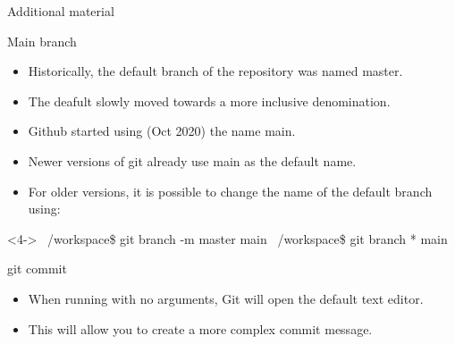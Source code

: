 \begin{frame}{Additional material}
  
\end{frame}

\begin{frame}[fragile]{Main branch}
  \begin{itemize}[<+->]
      \item Historically, the default branch of the repository was named \alert{master}.
      \item The deafult slowly moved towards a more inclusive denomination.
      \item Github started using (Oct 2020) the name \alert{main}.
      \item Newer versions of git already use \alert{main} as the default name.
      \item For older versions, it is possible to change the name of the default branch using:
  \end{itemize}
  \begin{shellblock}<4->
~/workspace\$ git branch -m master main\inserthitenter
~/workspace\$ git branch\inserthitenter
{\color{white}*} main
\end{shellblock}
\end{frame}

\begin{frame}[fragile]{git commit}
  \begin{itemize}[<+->]
      \item When running  with no arguments, Git will open the default text editor.
      \item This will allow you to create a more complex commit message.
  \end{itemize}
\end{frame}

